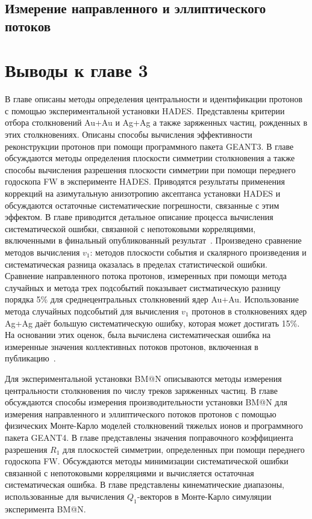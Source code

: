 \subsection{Измерение направленного и эллиптического потоков}

\section{Выводы к главе 3}

В главе описаны методы определения центральности и идентификации протонов с помощью экспериментальной установки HADES.
Представлены критерии отбора столкновений Au+Au и Ag+Ag а также заряженных частиц, рожденных в этих столкновениях.
Описаны способы вычисления эффективности реконструкции протонов при помощи программного пакета GEANT3.
В главе обсуждаются методы определения плоскости симметрии столкновения а также способы вычисления разрешения плоскости симметрии при помощи переднего годоскопа FW в эксперименте HADES.
Приводятся результаты применения коррекций на азимутальную анизотропию аксептанса установки HADES и обсуждаются остаточные систематические погрешности, связанные с этим эффектом.
В главе приводится детальное описание процесса вычисления систематической ошибки, связанной с непотоковыми корреляциями, включенными в финальный опубликованный результат~\cite{HADES:2020lob}.
Произведено сравнение методов вычисления $v_1$: методов плоскости события и скалярного произведения и систематическая разница оказалась в пределах статистической ошибки.
Сравнение направленного потока протонов, измеренных при помощи метода случайных и метода трех подсобытий показывает систматическую разницу порядка 5\% для среднецентральных столкновений ядер Au+Au.
Использование метода случайных подсобытий для вычисления $v_1$ протонов в столкновениях ядер Ag+Ag даёт большую систематическую ошибку, которая может достигать 15\%.
На основании этих оценок, была вычислена систематическая ошибка на измеренные значения коллективных потоков протонов, включенная в публикацию~\cite{HADES:2020lob}.

Для экспериментальной установки BM@N описываются методы измерения центральности столкновения по числу треков заряженных частиц. 
В главе обсуждаются способы измерения производительности установки BM@N для измерения направленного и эллиптического потоков протонов с помощью физических Монте-Карло моделей столкновений тяжелых ионов и программного пакета GEANT4.
В главе представлены значения поправочного коэффициента разрешения $R_1$ для плоскостей симметрии, определенных при помощи переднего годоскопа FW.
Обсуждаются методы минимизации систематической ошибки связанной с непотоковыми корреляциями и вычисляется остаточная систематическая ошибка.
В главе представлены кинематические диапазоны, использованные для вычисления $Q_1$-векторов в Монте-Карло симуляции эксперимента BM@N.